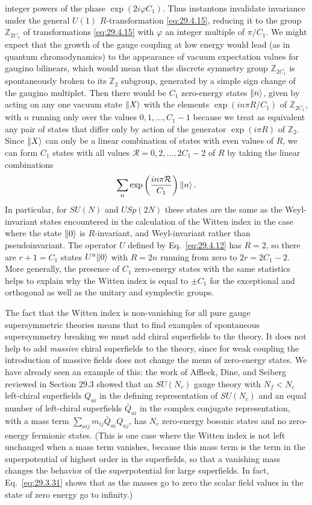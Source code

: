 integer powers of the phase \(\exp(2i\varphi C_1)\). Thus instantons
invalidate invariance under the general \(U(1)\) \(R\)-transformation
\eqref{eq:29.4.15}, reducing it to the group \(\mathbb{Z}_{2C_1}\) of
transformations \eqref{eq:29.4.15} with \(\varphi\) an integer multiple of
\(\pi/C_1\). We might expect that the growth of the gauge coupling at low
energy would lead (as in quantum chromodynamics) to the appearance of
vacuum expectation values for gaugino bilinears, which would mean that the
discrete symmetry group \(\mathbb{Z}_{2C_1}\) is spontaneously broken to
its \(\mathbb{Z}_2\) subgroup, generated by a simple sign change of the
gaugino multiplet. Then there would be \(C_1\) zero-energy states
\(\lVert n\rangle\), given by acting on any one vacuum state \(\lVert X\rangle\) with the
elements \(\exp(in\pi R/C_1)\) of \(\mathbb{Z}_{2C_1}\), with \(n\)
running only over the values \(0,1,\ldots,C_1-1\) because we treat as
equivalent any pair of states that differ only by action of the generator
\(\exp(i\pi R)\) of \(\mathbb{Z}_2\). Since \(\lVert X\rangle\) can only be a
linear combination of states with even values of \(R\), we can form
\(C_1\) states with all values \(\mathcal{R}=0,2,\ldots,2C_1-2\) of \(R\)
by taking the linear combinations
\[
  \sum_n\exp\left(\frac{in\pi\mathcal{R}}{C_1}\right)\lVert n\rangle\,.
\]
In particular, for \(SU(N)\) and \(USp(2N)\) these states are the same as
the Weyl-invariant states encountered in the calculation of the Witten
index in the case where the state \(\lVert 0\rangle\) is \(R\)-invariant, and
Weyl-invariant rather than pseudoinvariant. The operator \(U\) defined by
Eq.~\eqref{eq:29.4.12} has \(R=2\), so there are \(r+1=C_1\) states
\(U^n\lVert 0\rangle\) with \(R=2n\) running from zero to \(2r=2C_1-2\). More
generally, the presence of \(C_1\) zero-energy states with the same
statistics helps to explain why the Witten index is equal to \(\pm C_1\)
for the exceptional and orthogonal as well as the unitary and symplectic
groups.

The fact that the Witten index is non-vanishing for all pure gauge
supersymmetric theories means that to find examples of spontaneous
supersymmetry breaking we must add chiral superfields to the theory. It
does not help to add \emph{massive} chiral superfields to the theory, since
for weak coupling the introduction of massive fields does not change the
menu of zero-energy states. We have already seen an example of this: the
work of Affleck, Dine, and Seiberg reviewed in Section 29.3 showed that an
\(SU(N_c)\) gauge theory with \(N_f<N_c\) left-chiral superfields
\(Q_{ai}\) in the defining representation of \(SU(N_c)\) and an equal
number of left-chiral superfields \(\bar Q_{ai}\) in the complex conjugate
representation, with a mass term
\(\sum_{aij}m_{ij}\bar Q_{ai}Q_{aj}\), has \(N_c\) zero-energy bosonic
states and no zero-energy fermionic states. (This is one case where the
Witten index is not left unchanged when a mass term vanishes, because this
mass term is the term in the superpotential of highest order in the
superfields, so that a vanishing mass changes the behavior of the
superpotential for large superfields. In fact, Eq.~\eqref{eq:29.3.31}
shows that as the masses go to zero the scalar field values in the state of
zero energy go to infinity.)

